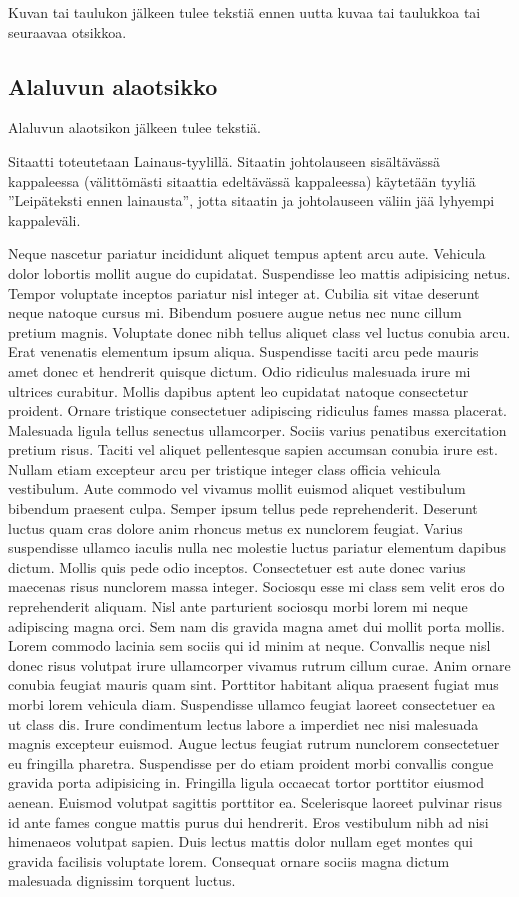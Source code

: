 Kuvan tai taulukon jälkeen tulee tekstiä ennen uutta kuvaa tai taulukkoa tai seuraavaa otsikkoa.

\subsection{Alaluvun alaotsikko}

Alaluvun alaotsikon jälkeen tulee tekstiä.

Sitaatti toteutetaan Lainaus-tyylillä. Sitaatin johtolauseen sisältävässä kappaleessa (välittömästi sitaattia edeltävässä kappaleessa) käytetään tyyliä ”Leipäteksti ennen lainausta”, jotta sitaatin ja johtolauseen väliin jää lyhyempi kappaleväli.

Neque nascetur pariatur incididunt aliquet tempus aptent arcu aute. Vehicula dolor lobortis mollit augue do cupidatat. Suspendisse leo mattis adipisicing netus. Tempor voluptate inceptos pariatur nisl integer at. Cubilia sit vitae deserunt neque natoque cursus mi. Bibendum posuere augue netus nec nunc cillum pretium magnis. Voluptate donec nibh tellus aliquet class vel luctus conubia arcu. Erat venenatis elementum ipsum aliqua. Suspendisse taciti arcu pede mauris amet donec et hendrerit quisque dictum.
Odio ridiculus malesuada irure mi ultrices curabitur. Mollis dapibus aptent leo cupidatat natoque consectetur proident. Ornare tristique consectetuer adipiscing ridiculus fames massa placerat. Malesuada ligula tellus senectus ullamcorper. Sociis varius penatibus exercitation pretium risus. Taciti vel aliquet pellentesque sapien accumsan conubia irure est. Nullam etiam excepteur arcu per tristique integer class officia vehicula vestibulum. Aute commodo vel vivamus mollit euismod aliquet vestibulum bibendum praesent culpa. Semper ipsum tellus pede reprehenderit. Deserunt luctus quam cras dolore anim rhoncus metus ex nunclorem feugiat. Varius suspendisse ullamco iaculis nulla nec molestie luctus pariatur elementum dapibus dictum.
Mollis quis pede odio inceptos. Consectetuer est aute donec varius maecenas risus nunclorem massa integer. Sociosqu esse mi class sem velit eros do reprehenderit aliquam. Nisl ante parturient sociosqu morbi lorem mi neque adipiscing magna orci. Sem nam dis gravida magna amet dui mollit porta mollis. Lorem commodo lacinia sem sociis qui id minim at neque. Convallis neque nisl donec risus volutpat irure ullamcorper vivamus rutrum cillum curae. Anim ornare conubia feugiat mauris quam sint. Porttitor habitant aliqua praesent fugiat mus morbi lorem vehicula diam.
Suspendisse ullamco feugiat laoreet consectetuer ea ut class dis. Irure condimentum lectus labore a imperdiet nec nisi malesuada magnis excepteur euismod. Augue lectus feugiat rutrum nunclorem consectetuer eu fringilla pharetra. Suspendisse per do etiam proident morbi convallis congue gravida porta adipisicing in. Fringilla ligula occaecat tortor porttitor eiusmod aenean. Euismod volutpat sagittis porttitor ea. Scelerisque laoreet pulvinar risus id ante fames congue mattis purus dui hendrerit. Eros vestibulum nibh ad nisi himenaeos volutpat sapien. Duis lectus mattis dolor nullam eget montes qui gravida facilisis voluptate lorem. Consequat ornare sociis magna dictum malesuada dignissim torquent luctus.

